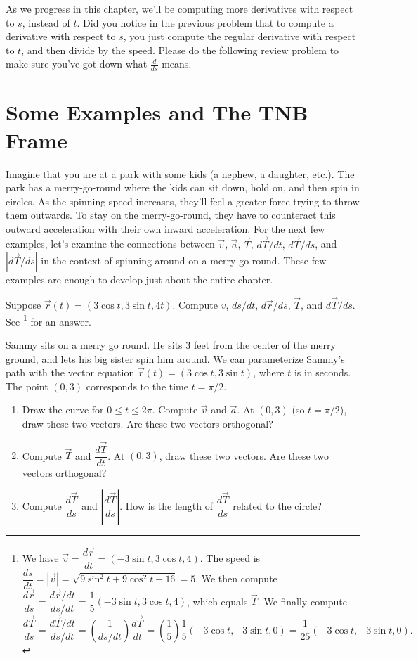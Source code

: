 As we progress in this chapter, we'll be computing more derivatives with respect to $s$, instead of $t$. Did you notice in the previous problem that to compute a derivative with respect to $s$, you just compute the regular derivative with respect to $t$, and then divide by the speed. Please do the following review problem to make sure you've got down what $\frac{d}{ds}$ means. 



\section{Some Examples and The TNB Frame}

Imagine that you are at a park with some kids (a nephew, a daughter, etc.).  The park has a merry-go-round where the kids can sit down, hold on, and then spin in circles. As the spinning speed increases, they'll feel a greater  force trying to throw them  outwards. To stay on the merry-go-round, they have to counteract this outward acceleration with their own inward acceleration. For the next few examples, let's examine the connections between $\vec v$, $\vec a$, $\vec T$, $d\vec T/dt$, $d\vec T/ds$, and $|d\vec T/ds|$ in the context of spinning around on a merry-go-round. These few examples are enough to develop just about the entire chapter. 

\begin{review*}
 Suppose $\vec r(t)=(3\cos t,3\sin t,4t)$.  Compute $v$, $ds/dt$, $d\vec r/ds$, $\vec T$, and $d\vec T/ds$. See 
\footnote{
We have $\vec v = \dfrac{d\vec r}{dt} = (-3\sin t, 3\cos t, 4)$. 
The speed is $\dfrac{ds}{dt}=|\vec v| = \sqrt{9\sin^2t+9\cos^2t+16}=5$.  
We then compute $\dfrac{d\vec r}{ds}=\dfrac{d\vec r/dt}{ds/dt} = \dfrac{1}{5}(-3\sin t, 3\cos t, 4)$, 
which equals $\vec T$.
We finally compute
$$
\dfrac{d\vec T}{ds}=\dfrac{d\vec T/dt}{ds/dt}=\left(\dfrac{1}{ds/dt}\right)\dfrac{d\vec T}{dt} = \left(\dfrac{1}{5}\right)\dfrac{1}{5}(-3\cos t, -3\sin t, 0) =  \dfrac{1}{25}(-3\cos t, -3\sin t, 0).  
$$
} for an answer.
\end{review*}


\begin{problem}
 Sammy sits on a merry go round. He sits 3 feet from the center of the merry ground, and lets his big sister spin him around. We can parameterize Sammy's path with the vector equation $\vec r(t) = (3\cos t, 3\sin t)$, where $t$ is in seconds.  The point $(0,3)$ corresponds to the time $t=\pi/2$.
\begin{enumerate}
 \item Draw the curve for $0\leq t\leq 2\pi$. Compute $\vec v$ and $\vec a$. At $(0,3)$ (so $t=\pi/2$), draw these two vectors. Are these two vectors orthogonal? 
 \item Compute $\vec T$ and $\dfrac{d\vec T}{dt}$. At $(0,3)$, draw these two vectors. Are these two vectors orthogonal? 
 \item Compute $\dfrac{d\vec T}{ds}$ and $\left|\dfrac{d\vec T}{ds}\right|$. How is the length of $\dfrac{d\vec T}{ds}$ related to the circle?  
\end{enumerate}
\end{problem}


